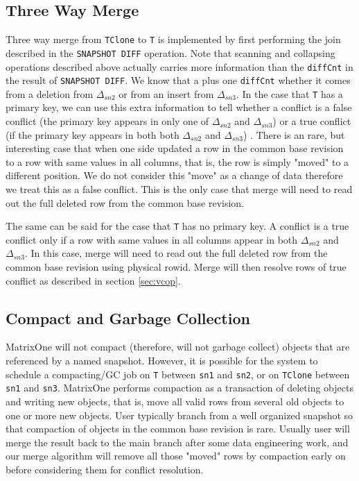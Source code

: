 \documentclass[sigconf,nonacm]{acmart} %
\begin{document}
\subsection{Three Way Merge}
Three way merge from \texttt{TClone} to \texttt{T} is implemented by first 
performing the join described in the \texttt{SNAPSHOT DIFF} operation.  
Note that scanning and collapsing operations described above actually
carries more information than the \texttt{diffCnt} in the result of \texttt{SNAPSHOT DIFF}.
We know that a plus one \texttt{diffCnt} whether it comes from a deletion from $\Delta_{sn2}$
or from an insert from $\Delta_{sn3}$.  
In the case that \texttt{T} has a primary key, we can use this extra information to tell
whether a conflict is 
a false conflict 
(the primary key appears in only one of $\Delta_{sn2}$ and $\Delta_{sn3}$)
or a true conflict 
(if the primary key appears in both both $\Delta_{sn2}$ and $\Delta_{sn3}$)
.  There is an rare, but interesting case that when one side updated a row 
in the common base revision to a row with same values in all columns, 
that is, the row is simply "moved" to a different position.  We do not 
consider this "move" as a change of data therefore we treat this as a 
false conflict.  This is the only case that merge will need to read out
the full deleted row from the common base revision.

The same can be said for the case that \texttt{T} has no primary key.
A conflict is a true conflict only if a row with same values in all columns
appear in both $\Delta_{sn2}$ and $\Delta_{sn3}$.  In this case, merge will 
need to read out the full deleted row from the common base revision using 
physical rowid.  Merge will then resolve rows of true conflict as described
in section \ref{sec:vcop}.

\subsection{Compact and Garbage Collection}
MatrixOne will not compact (therefore, will not garbage collect) objects that 
are referenced by a named snapshot.  However, it is possible for the system to
schedule a compacting/GC job on \texttt{T} between \texttt{sn1} and \texttt{sn2}, 
or on \texttt{TClone} between \texttt{sn1} and \texttt{sn3}.  MatrixOne performs
compaction as a transaction of deleting objects and writing new objects, that is,
move all valid rows from several old objects to one or more new objects.  
User typically branch from a well organized snapshot so that compaction of objects
in the common base revision is rare.  Usually user will merge the result back to the 
main branch after some data engineering work, and our merge algorithm will remove 
all those "moved" rows by compaction early on before considering them for conflict 
resolution.   
\end{document}

